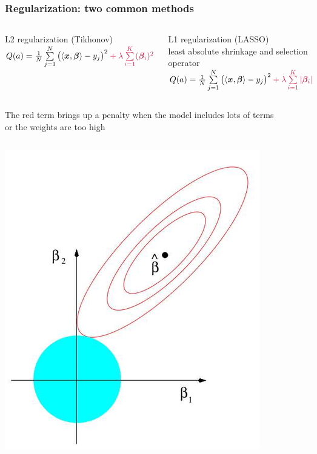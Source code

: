 \documentclass[12pt, aspectratio = 169]{beamer}
\begin{document}

\begin{frame}[t]
	\frametitle{Regularization: two common methods}
	\vspace{-0.5em}
	\begin{columns}[t]
		\begin{minipage}[t]{\linewidth}
			\centering L2 regularization (Tikhonov)\\
			\vspace{1em}
			$Q(a)=\frac{1}{N}\sum\limits_{j=1}^{N}\big(\langle\bm{x},\bm{\beta}\rangle - y_j\big)^2 \color{calmRed}+ \lambda \sum\limits_{i=1}^{K}(\bm\beta_i)^2 $
		\end{minipage}%
		\begin{minipage}[t]{\linewidth}
			\centering L1 regularization (LASSO)\\
			\tiny{\color{gray}least absolute shrinkage and selection operator}
			\normalsize
			$Q(a) = \frac{1}{N}\sum\limits_{j=1}^{N}\big(\langle\bm{x},\bm{\beta}\rangle - y_j\big)^2 \color{calmRed} + \lambda \sum\limits_{i=1}^{K}|\bm\beta_i| $
		\end{minipage}%
	\end{columns}
	\centering 
	\vspace{0.5em}
	The red term brings up a penalty when the model includes lots of terms\\or the weights are too high\\
	\begin{columns}[t]
		\centering
		\includegraphics[width=0.4\linewidth]{ridge}

\end{columns}
\end{frame}
\end{document}
